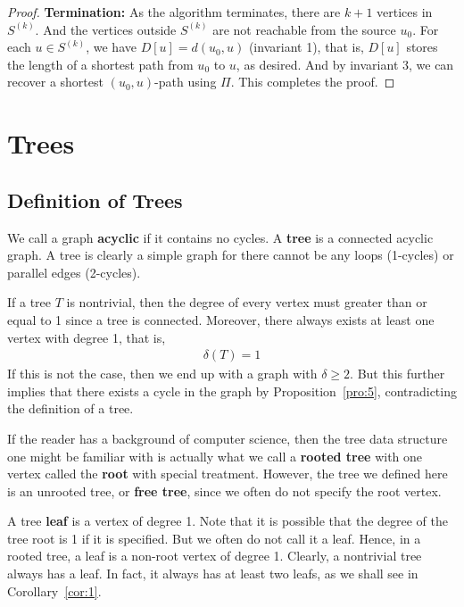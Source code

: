 \documentclass[thmcnt=section, 12pt, color=cyan]{my-elegantbook}
\begin{document}
\begin{proof}
    \noindent\textbf{Termination:} As the algorithm terminates, there are $k+1$ vertices in $S^{(k)}$. And the vertices outside $S^{(k)}$ are not reachable from the source $u_0$. For each $u \in S^{(k)}$, we have $D[u] = d(u_0, u)$ (invariant 1), that is, $D[u]$ stores the length of a shortest path from $u_0$ to $u$, as desired. And by invariant 3, we can recover a shortest $(u_0, u)$-path using $\Pi$. This completes the proof.
\end{proof}


\chapter{Trees} \label{chap:1}


\section{Definition of Trees}

We call a graph \textbf{acyclic}
if it contains no cycles.
A \textbf{tree} is a connected acyclic graph.
A tree is clearly a simple graph for there cannot be any loops (1-cycles)
or parallel edges (2-cycles).

If a tree $T$ is nontrivial, then the degree of every vertex
must greater than or equal to 1 since a tree is connected.
Moreover, there always exists at least one vertex with degree 1,
that is,
\begin{align*}
    \delta(T) = 1
\end{align*}
If this is not the case, then we end up with a graph with 
$\delta \geq 2$. 
But this further implies that there exists a cycle
in the graph by Proposition~\ref{pro:5}, 
contradicting the definition of a tree.

If the reader has a background of computer science,
then the tree data structure one might be familiar with
is actually what we call a \textbf{rooted tree}
with one vertex called the \textbf{root} 
with special treatment.
However, the tree we defined here is an unrooted tree, 
or \textbf{free tree},
since we often do not specify the root vertex.

A tree \textbf{leaf} is a vertex of degree 1. 
Note that it is possible that the degree of the tree root is 1
if it is specified.
But we often do not call it a leaf.
Hence, in a rooted tree, a leaf is a non-root vertex of degree 1.
Clearly, a nontrivial tree always has a leaf.
In fact, it always has at least two leafs,
as we shall see in Corollary~\ref{cor:1}.
\end{document}
